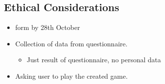\documentclass[11pt]{article}
\begin{document}
\subsection{Ethical Considerations}
\label{ethicalconsiderations}

\begin{itemize}
\item form by 28th October

\item Collection of data from questionnaire.

\begin{itemize}
\item Just result of questionnaire, no personal data

\end{itemize}

\item Asking user to play the created game.

\end{itemize}
\end{document}
